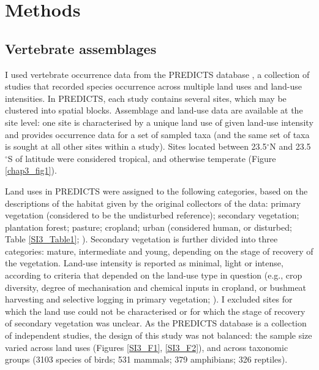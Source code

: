\section{Methods}

\subsection{Vertebrate assemblages}

I used vertebrate occurrence data from the PREDICTS database \citep{Hudson2014, Hudson2017}, a collection of studies that recorded species occurrence across multiple land uses and land-use intensities. In PREDICTS, each study contains several sites, which may be clustered into spatial blocks. Assemblage and land-use data are available at the site level: one site is characterised by a unique land use of given land-use intensity and provides occurrence data for a set of sampled taxa (and the same set of taxa is sought at all other sites within a study). Sites located between 23.5$^{\circ}$N and 23.5$^{\circ}$S of latitude were considered tropical, and otherwise temperate (Figure \ref{chap3_fig1}).

Land uses in PREDICTS were assigned to the following categories, based on the descriptions of the habitat given by the original collectors of the data: primary vegetation (considered to be the undisturbed reference); secondary vegetation; plantation forest; pasture; cropland; urban (considered human, or disturbed; Table \ref{SI3_Table1};  \cite{Hudson2014, Hudson2017}). Secondary vegetation is further divided into three categories: mature, intermediate and young, depending on the stage of recovery of the vegetation. Land-use intensity is reported as minimal, light or intense, according to criteria that depended on the land-use type in question (e.g., crop diversity, degree of mechanisation and chemical inputs in cropland, or bushmeat harvesting and selective logging in primary vegetation; \cite{Hudson2014}). I excluded sites for which the land use could not be characterised or for which the stage of recovery of secondary vegetation was unclear. As the PREDICTS database is a collection of independent studies, the design of this study was not balanced: the sample size varied across land uses (Figures \ref{SI3_F1}, \ref{SI3_F2}), and across taxonomic groups (3103 species of birds; 531 mammals; 379 amphibians; 326 reptiles).

